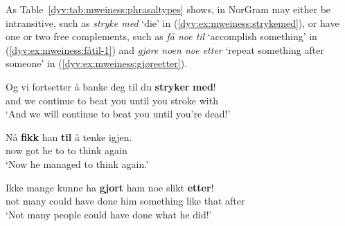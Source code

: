 \documentclass[output=paper]{langsci/langscibook}
\begin{document}
 As Table~\ref{dyv:tab:mweiness:phrasaltypes} shows,  in NorGram may either be intransitive, such as \emph{stryke med} `die' in (\ref{dyv:ex:mweiness:strykemed}), or have one or two free complements, such as \emph{få noe til} `accomplish something' in (\ref{dyv:ex:mweiness:fåtil-1}) and \emph{gjøre noen noe etter} `repeat something after someone' in (\ref{dyv:ex:mweiness:gjøreetter}).


\ea\label{dyv:ex:mweiness:strykemed}
\gll Og vi fortsetter å banke deg til du \textbf{stryker} \textbf{med}! \\ 
 and we continue to beat you until you stroke with \\
\glt `And we will continue to beat you until you're dead!' \\ 
\z

\ea\label{dyv:ex:mweiness:fåtil-1}
\gll Nå \textbf{fikk} han \textbf{til} å tenke igjen. \\
 now got he to to think again \\
\glt `Now he managed to think again.' \\
\z

%
\ea\label{dyv:ex:mweiness:gjøreetter}
\gll Ikke mange kunne ha \textbf{gjort} ham noe slikt \textbf{etter}! \\ 
  not many could have done him something {like that} after \\
\glt `Not many people could have done what he did!' \\ 
\z
\end{document}
